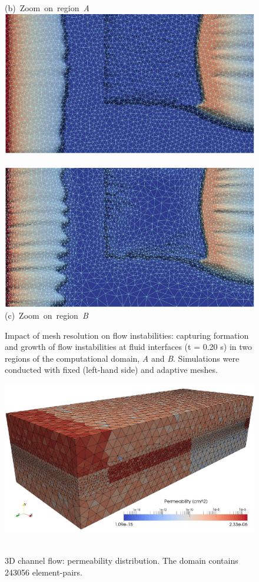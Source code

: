 \begin{figure}[ht]
{      \vspace{-0.cm}\hbox{\hspace{4.5cm}(b) Zoom on region {\it A}  }\vspace{-0.cm}
      \hbox{ \includegraphics[width=.5\textwidth, height=0.3\textwidth,clip]{./Pics1/Section4_4/5r_po_left_inlet_D251_Zoom2b.pdf}
             \includegraphics[width=.5\textwidth, height=0.3\textwidth,clip]{./Pics1/Section4_4/5r_po_left_inlet_adapt_D251_Zoom2b.pdf}}
      \vspace{-0.cm}\hbox{\hspace{4.5cm}(c) Zoom on region {\it B}  }\vspace{-0.cm}}
\caption{Impact of mesh resolution on flow instabilities: capturing formation and growth of flow instabilities at fluid interfaces (t = 0.20 s) in two regions of the computational domain, {\it A} and {\it B}. Simulations were conducted with fixed (left-hand side) and adaptive meshes. }
\label{fig:5regions_AdaptZoom}
\end{figure}
\clearpage



\begin{figure}[ht]
\vbox{\vspace{-.5cm}
      \hbox{\includegraphics[width=\textwidth]{./Pics1/3D_Channel/Test_SlowNew_MeshPermeability.pdf} }}
\caption{3D channel flow: permeability distribution. The domain contains 243056  element-pairs.}
\label{fig:3DChannel_PermMesh}
\end{figure}
\clearpage



